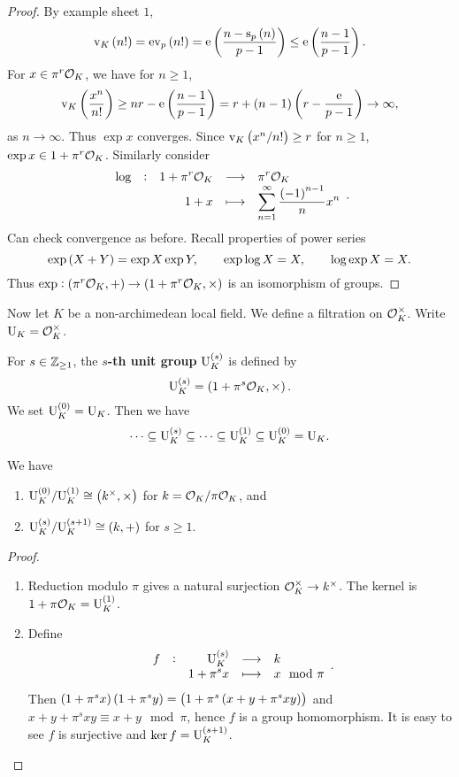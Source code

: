 \begin{proof}
By example sheet $ 1 $,
$$ \v_K\br{n!} = \e\v_p\br{n!} = \e\br{\dfrac{n - \s_p\br{n}}{p - 1}} \le \e\br{\dfrac{n - 1}{p - 1}}. $$
For $ x \in \pi^r\mathcal{O}_K $, we have for $ n \ge 1 $,
$$ \v_K\br{\dfrac{x^n}{n!}} \ge nr - \e\br{\dfrac{n - 1}{p - 1}} = r + \br{n - 1}\br{r - \dfrac{\e}{p - 1}} \to \infty, $$
as $ n \to \infty $. Thus $ \exp x $ converges. Since $ \v_K\br{x^n / n!} \ge r $ for $ n \ge 1 $, $ \exp x \in 1 + \pi^r\mathcal{O}_K $. Similarly consider
$$ \function[\log]{1 + \pi^r\OOO_K}{\pi^r\OOO_K}{1 + x}{\sum_{n = 1}^\infty \dfrac{\br{-1}^{n - 1}}{n}x^n}. $$
Can check convergence as before. Recall properties of power series
$$ \exp \br{X + Y} = \exp X\exp Y, \qquad \exp \log X = X, \qquad \log \exp X = X. $$
Thus $ \exp : \br{\pi^r\OOO_K, +} \to \br{1 + \pi^r\OOO_K, \times} $ is an isomorphism of groups.
\end{proof}

Now let $ K $ be a non-archimedean local field. We define a filtration on $ \mathcal{O}_K^\times $. Write $ \mathrm{U}_K = \mathcal{O}_K^\times $.

\begin{definition}
For $ s \in \mathbb{Z}_{\ge 1} $, the \textbf{$ s $-th unit group} $ \U_K^{\br{s}} $ is defined by
$$ \U_K^{\br{s}} = \br{1 + \pi^s\OOO_K, \times}. $$
We set $ \U_K^{\br{0}} = \U_K $. Then we have
$$ \dots \subseteq \U_K^{\br{s}} \subseteq \dots \subseteq \U_K^{\br{1}} \subseteq \U_K^{\br{0}} = \U_K. $$
\end{definition}

\begin{proposition}
\label{prop:15.3}
We have
\begin{enumerate}
\item $ \U_K^{\br{0}} / \U_K^{\br{1}} \cong \br{k^\times, \times} $ for $ k = \mathcal{O}_K / \pi\mathcal{O}_K $, and
\item $ \U_K^{\br{s}} / \U_K^{\br{s + 1}} \cong \br{k, +} $ for $ s \ge 1 $.
\end{enumerate}
\end{proposition}

\begin{proof}
\hfill
\begin{enumerate}
\item Reduction modulo $ \pi $ gives a natural surjection $ \mathcal{O}_K^\times \to k^\times $. The kernel is $ 1 + \pi\OOO_K = \U_K^{\br{1}} $.
\item Define
$$ \function[f]{\U_K^{\br{s}}}{k}{1 + \pi^sx}{x \mod \pi}. $$
Then $ \br{1 + \pi^sx}\br{1 + \pi^sy} = \br{1 + \pi^s\br{x + y + \pi^sxy}} $ and $ x + y + \pi^sxy \equiv x + y \mod \pi $, hence $ f $ is a group homomorphism. It is easy to see $ f $ is surjective and $ \ker f = \U_K^{\br{s + 1}} $.
\end{enumerate}
\end{proof}

